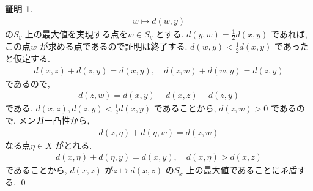 \documentclass[10pt, fleqn, label-section=none]{bxjsarticle}
\theoremstyle{definition}
\newtheorem*{pf*}{証明}
\renewcommand{\;}{\, ; \,}
\begin{document}
\begin{pf*}
\begin{align*} w \mapsto d(w, y) \end{align*}
の$S_y$ 上の最大値を実現する点を$w \in S_y$ とする. $d(y, w) = \frac{1}{2}d(x, y)$ であれば, この点$w$ が求める点であるので証明は終了する. $d(w, y) < \frac{1}{2}d(x, y)$ であったと仮定する. 
\begin{align*} d(x, z ) + d(z, y) = d(x, y), \quad d(z, w) + d(w, y) = d(z, y)\end{align*}
であるので, 
\begin{align*} d(z, w) = d(x, y) - d(x, z) - d(z, y)\end{align*}
である. $d(x, z), d(z, y) < \frac{1}{2}d(x, y)$ であることから, $d(z, w) > 0$ であるので, メンガー凸性から, 
\begin{align*} d(z, \eta) + d(\eta , w) = d(z, w) \end{align*}
なる点$\eta \in X$ がとれる. 
\begin{align*} d(x, \eta) + d(\eta, y) = d(x, y), \quad d(x, \eta) > d(x, z) \end{align*}
であることから, $d(x, z)$ が$z \mapsto d(x, z)$ の$S_x$ 上の最大値であることに矛盾する. 
\qed
\end{pf*}
\end{document}

